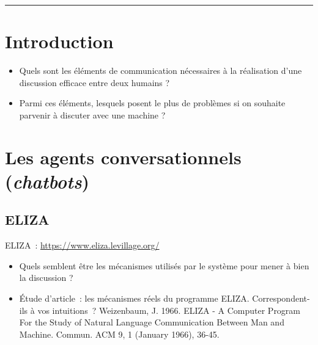 
\newcommand{\numTD}{TD1}
\newcommand{\themeTD}{Chatbots et Test de Turing}


\hrule

\noindent{}

\section{Introduction}

\begin{itemize}
 \item Quels sont les éléments de communication nécessaires à la réalisation d'une discussion efficace entre deux humains ?
 \item Parmi ces éléments, lesquels posent le plus de problèmes si on souhaite parvenir à discuter avec une machine ?
\end{itemize}

\section{Les agents conversationnels (\textit{chatbots})}

\subsection{ELIZA}
ELIZA : \url{https://www.eliza.levillage.org/}
\begin{itemize}
  \item Quels semblent être les mécanismes utilisés par le système pour mener à bien la discussion ?
  \item Étude d'article : les mécanismes réels du programme ELIZA. Correspondent-ils à vos intuitions ?
Weizenbaum, J. 1966. ELIZA - A Computer Program For the Study of Natural Language Communication Between Man and Machine. Commun. ACM 9, 1 (January 1966), 36-45.
  \end{itemize}

